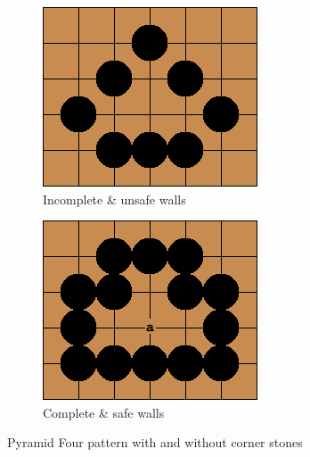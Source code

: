 \documentclass{l4proj}
\begin{document}
\begin{figure}[!ht]
\centering
\begin{subfigure}[b]{0.35\textwidth}
\centering
\includegraphics[width=\textwidth]{pat/2a.png}
\caption{Incomplete \& unsafe walls}
\label{fig:pat-2a}
\end{subfigure}\qquad
\begin{subfigure}[b]{0.35\textwidth}
\centering
\includegraphics[width=\textwidth]{pat/2b.png}
\caption{Complete \& safe walls}
\label{fig:pat-2b}
\end{subfigure}
\caption{Pyramid Four pattern with and without corner stones}
\label{fig:pat-2}
\end{figure}
\end{document}
